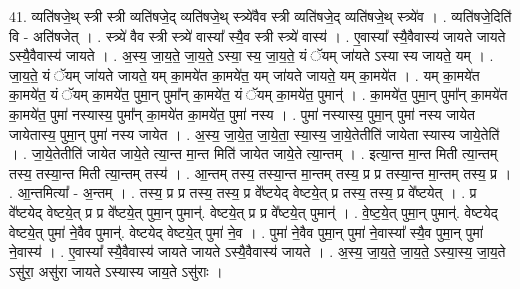 \documentclass[17pt]{extarticle}
\begin{document}
41. व्यति॑षजे॒थ् स्त्री स्त्री व्यति॑षजे॒द् व्यति॑षजे॒थ् स्त्र्ये॑वैव स्त्री व्यति॑षजे॒द् व्यति॑षजे॒थ् स्त्र्ये॑व । . व्यति॑षजे॒दिति॑ वि - अति॑षजेत् । . स्त्र्ये॑ वैव स्त्री स्त्र्ये॑ वास्या᳚ स्यै॒व स्त्री स्त्र्ये॑ वास्य॑ । . ए॒वास्या᳚ स्यै॒वैवास्य॑ जायते जायते ऽस्यै॒वैवास्य॑ जायते । . अ॒स्य॒ जा॒य॒ते॒ जा॒य॒ते॒ ऽस्या॒ स्य॒ जा॒य॒ते॒ यं ॅयम् जा॑यते ऽस्या स्य जायते॒ यम् । . जा॒य॒ते॒ यं ॅयम् जा॑यते जायते॒ यम् का॒मये॑त का॒मये॑त॒ यम् जा॑यते जायते॒ यम् का॒मये॑त । . यम् का॒मये॑त का॒मये॑त॒ यं ॅयम् का॒मये॑त॒ पुमा॒न् पुमा᳚न् का॒मये॑त॒ यं ॅयम् का॒मये॑त॒ पुमान्॑ । . का॒मये॑त॒ पुमा॒न् पुमा᳚न् का॒मये॑त का॒मये॑त॒ पुमा॑ नस्यास्य॒ पुमा᳚न् का॒मये॑त का॒मये॑त॒ पुमा॑ नस्य । . पुमा॑ नस्यास्य॒ पुमा॒न् पुमा॑ नस्य जायेत जायेतास्य॒ पुमा॒न् पुमा॑ नस्य जायेत । . अ॒स्य॒ जा॒ये॒त॒ जा॒ये॒ता॒ स्या॒स्य॒ जा॒ये॒तेतीति॑ जायेता स्यास्य जाये॒तेति॑ । . जा॒ये॒तेतीति॑ जायेत जाये॒ते त्या॒न्त मा॒न्त मिति॑ जायेत जाये॒ते त्या॒न्तम् । . इत्या॒न्त मा॒न्त मिती त्या॒न्तम् तस्य॒ तस्या॒न्त मिती त्या॒न्तम् तस्य॑ । . आ॒न्तम् तस्य॒ तस्या॒न्त मा॒न्तम् तस्य॒ प्र प्र तस्या॒न्त मा॒न्तम् तस्य॒ प्र । . आ॒न्तमित्या᳚ - अ॒न्तम् । . तस्य॒ प्र प्र तस्य॒ तस्य॒ प्र वे᳚ष्टयेद् वेष्टये॒त् प्र तस्य॒ तस्य॒ प्र वे᳚ष्टयेत् । . प्र वे᳚ष्टयेद् वेष्टये॒त् प्र प्र वे᳚ष्टये॒त् पुमा॒न् पुमान्॑. वेष्टये॒त् प्र प्र वे᳚ष्टये॒त् पुमान्॑ । . वे॒ष्ट॒ये॒त् पुमा॒न् पुमान्॑. वेष्टयेद् वेष्टये॒त् पुमा॑ ने॒वैव पुमान्॑. वेष्टयेद् वेष्टये॒त् पुमा॑ ने॒व । . पुमा॑ ने॒वैव पुमा॒न् पुमा॑ ने॒वास्या᳚ स्यै॒व पुमा॒न् पुमा॑ ने॒वास्य॑ । . ए॒वास्या᳚ स्यै॒वैवास्य॑ जायते जायते ऽस्यै॒वैवास्य॑ जायते । . अ॒स्य॒ जा॒य॒ते॒ जा॒य॒ते॒ ऽस्या॒स्य॒ जा॒य॒ते ऽसु॑रा॒ असु॑रा जायते ऽस्यास्य जाय॒ते ऽसु॑राः । \newline
\pagebreak
{}
\end{document}
